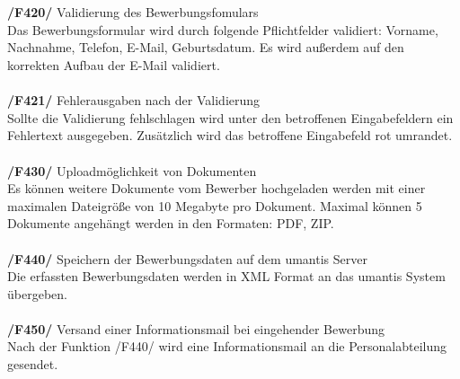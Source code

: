 \\ \\
\textbf{/F420/} Validierung des Bewerbungsfomulars \\
Das Bewerbungsformular wird durch folgende Pflichtfelder validiert: Vorname, Nachnahme, Telefon, E-Mail, Geburtsdatum. Es wird außerdem auf den korrekten Aufbau der E-Mail validiert.
\\ \\
\textbf{/F421/} Fehlerausgaben nach der Validierung \\
Sollte die Validierung fehlschlagen wird unter den betroffenen Eingabefeldern ein Fehlertext ausgegeben. Zusätzlich wird das betroffene Eingabefeld rot umrandet.
\\ \\
\textbf{/F430/} Uploadmöglichkeit von Dokumenten \\
Es können weitere Dokumente vom Bewerber hochgeladen werden mit einer maximalen Dateigröße von 10 Megabyte pro Dokument. Maximal können 5 Dokumente angehängt werden in den Formaten: PDF, ZIP.
\\ \\
\textbf{/F440/} Speichern der Bewerbungsdaten auf dem umantis Server \\
Die erfassten Bewerbungsdaten werden in XML Format an das umantis System übergeben.
\\ \\
\textbf{/F450/} Versand einer Informationsmail bei eingehender Bewerbung \\
Nach der Funktion /F440/ wird eine Informationsmail an die Personalabteilung gesendet.
